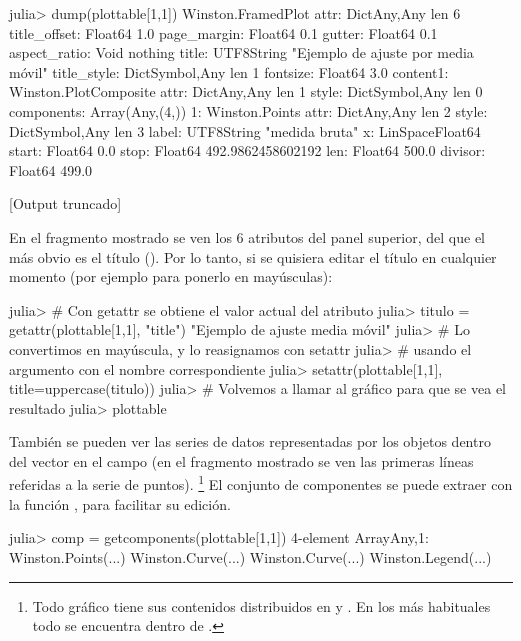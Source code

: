 \begin{jlconcode}
julia> dump(plottable[1,1])
Winston.FramedPlot 
  attr: Dict{Any,Any} len 6
    title_offset: Float64 1.0
    page_margin: Float64 0.1
    gutter: Float64 0.1
    aspect_ratio: Void nothing
    title: UTF8String "Ejemplo de ajuste por media móvil"
    title_style: Dict{Symbol,Any} len 1
      fontsize: Float64 3.0
  content1: Winston.PlotComposite 
    attr: Dict{Any,Any} len 1
      style: Dict{Symbol,Any} len 0
    components: Array(Any,(4,))
      1: Winston.Points 
        attr: Dict{Any,Any} len 2
          style: Dict{Symbol,Any} len 3
          label: UTF8String "medida bruta"
        x: LinSpace{Float64} 
          start: Float64 0.0
          stop: Float64 492.9862458602192
          len: Float64 500.0
          divisor: Float64 499.0

[Output truncado]
\end{jlconcode}

En el fragmento mostrado se ven los 6 atributos del panel superior, del que el más obvio es el título (). Por lo tanto, si se quisiera editar el título en cualquier momento (por ejemplo para ponerlo en mayúsculas):

\begin{jlconcode}
julia> # Con getattr se obtiene el valor actual del atributo
julia> titulo = getattr(plottable[1,1], "title")
"Ejemplo de ajuste  media móvil"
julia> # Lo convertimos en mayúscula, y lo reasignamos con setattr
julia> # usando el argumento con el nombre correspondiente
julia> setattr(plottable[1,1], title=uppercase(titulo))
julia> # Volvemos a llamar al gráfico para que se vea el resultado
julia> plottable
\end{jlconcode}

También se pueden ver las series de datos representadas por los objetos dentro del vector  en el campo  (en el fragmento mostrado se ven las primeras líneas referidas a la serie de puntos).%
\footnote{%
Todo gráfico tiene sus contenidos distribuidos en  y
. En los más habituales todo se encuentra dentro de
.%
}
El conjunto de componentes se puede extraer con la función , para facilitar su edición.

\begin{jlconcode}
julia> comp = getcomponents(plottable[1,1])
4-element Array{Any,1}:
 Winston.Points(...)
 Winston.Curve(...) 
 Winston.Curve(...) 
 Winston.Legend(...)
\end{jlconcode}


